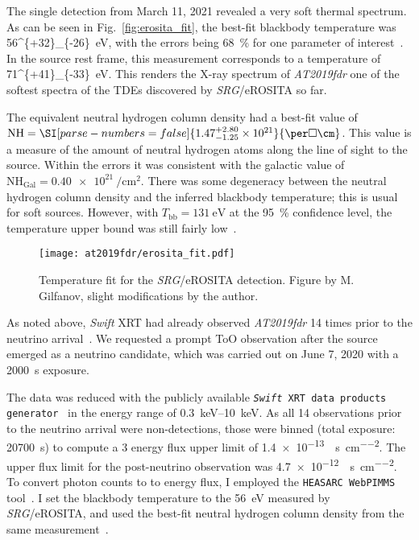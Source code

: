 The single detection from March 11, 2021 revealed a very soft thermal spectrum. As can be seen in Fig.~\ref{fig:erosita_fit}, the best-fit blackbody temperature was \SI[parse-numbers = false]{56^{+32}_{-26}}{\eV}, with the errors being \SI{68}{\percent} for one parameter of interest~. In the source rest frame, this measurement corresponds to a temperature of \SI[parse-numbers = false]{71^{+41}_{-33}}{\eV}. This renders the X-ray spectrum of \emph{AT2019fdr} one of the softest spectra of the TDEs discovered by \textit{SRG}/eROSITA so far.

The equivalent neutral hydrogen column density had a best-fit value of $\text{NH}=\SI[parse-numbers = false]{1.47^{+2.80}_{-1.25}\times10^{21}}{\per\square\cm}$. This value is a measure of the amount of neutral hydrogen atoms along the line of sight to the source. Within the errors it was consistent with the galactic value of $\text{NH}_\text{Gal} = \SI{0.40e21}{\per\square\cm}$. There was some degeneracy between the neutral hydrogen column density and the inferred blackbody temperature; this is usual for soft sources. However, with $T_\text{bb}=\SI{131}{\eV}$ at the \SI{95}{\percent} confidence level, the temperature upper bound was still fairly low~\cite{Reusch2022}.

\begin{figure}[htb]
    \texttt{[image: at2019fdr/erosita\_fit.pdf]}
    \caption[\textit{SRG}/eROSITA temperature fit]{Temperature fit for the \textit{SRG}/eROSITA detection. Figure by M. Gilfanov, slight modifications by the author.}
\end{figure}

As noted above, \textit{Swift} XRT had already observed \emph{AT2019fdr} 14 times prior to the neutrino arrival~\cite{Frederick2021}. We requested a prompt ToO observation after the source emerged as a neutrino candidate, which was carried out on June 7, 2020 with a \SI{2000}{\s} exposure.

The data was reduced with the publicly available \texttt{\textit{Swift} XRT data products generator}~ in the energy range of \SIrange{0.3}{10}{\kilo\eV}. As all 14 observations prior to the neutrino arrival were non-detections, those were binned (total exposure: \SI{20700}{\s}) to compute a \SI{3}{\sigma} energy flux upper limit of \SI{1.4e-13}{\erg\per\s\per\square\cm}. The upper flux limit for the post-neutrino observation was \SI{4.7e-12}{\erg\per\s\per\square\cm}. To convert photon counts to to energy flux, I employed the \texttt{HEASARC WebPIMMS} tool~. I set the blackbody temperature to the \SI{56}{\eV} measured by \textit{SRG}/eROSITA, and used the best-fit neutral hydrogen column density from the same measurement~\cite{Reusch2022}.

